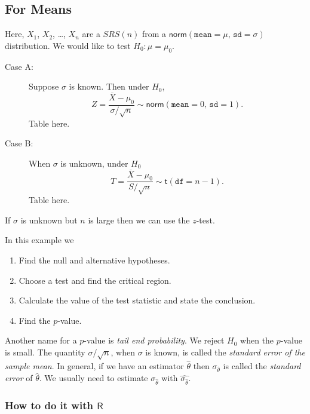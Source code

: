 \documentclass[captions=tableheading]{scrbook}
\begin{document}
\subsection{For Means}
\label{sec-10-3-1}


Here, \(X_{1}\), \(X_{2}\), \ldots{}, \(X_{n}\) are a \(SRS(n)\) from a \(\mathsf{norm}(\mathtt{mean}=\mu,\,\mathtt{sd}=\sigma)\) distribution. We would like to test \(H_{0}:\mu=\mu_{0}\).

\begin{description}
\item[Case A:] Suppose \(\sigma\) is known. Then under \(H_{0}\),
   \[
   Z=\frac{\overline{X}-\mu_{0}}{\sigma/\sqrt{n}}\sim\mathsf{norm}(\mathtt{mean}=0,\,\mathtt{sd}=1).
   \]
   Table here.
\item[Case B:] When \(\sigma\) is unknown, under \(H_{0}\)
   \[
   T = \frac{\overline{X}-\mu_{0}}{S/\sqrt{n}}\sim\mathsf{t}(\mathtt{df}=n-1).
   \]
   Table here.
\end{description}


\begin{rem}
If \(\sigma\) is unknown but \(n\) is large then we can use the \(z\)-test.
\end{rem}

\begin{example}
In this example we
\begin{enumerate}
\item Find the null and alternative hypotheses.
\item Choose a test and find the critical region.
\item Calculate the value of the test statistic and state the conclusion.
\item Find the \(p\)-value.
\end{enumerate}

\end{example}

\begin{rem}
Another name for a \(p\)-value is \emph{tail end probability}. We reject \(H_{0}\) when the \(p\)-value is small.
The quantity \(\sigma/\sqrt{n}\), when \(\sigma\) is known, is called the \emph{standard error of the sample mean}. In general, if we have an estimator \(\hat{\theta}\) then \(\sigma_{\hat{\theta}}\) is called the \emph{standard error} of \(\hat{\theta}\). We usually need to estimate \(\sigma_{\hat{\theta}}\) with \(\hat{\sigma_{\hat{\theta}}}\).
\end{rem}
\subsubsection{How to do it with \(\mathsf{R}\)}
\label{sec-10-3-1-1}
\end{document}
